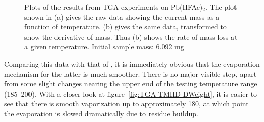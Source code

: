 \begin{figure}[tbp]
   \centering
	\hspace{1cm}
   \caption[TGA Results for Pb(HFAc)$_{2}$ Precursor]%
   		{Plots of the results from TGA experiments on Pb(HFAc)$_{2}$. The plot shown in (a) gives the raw %
		data showing the current mass as a function of temperature. (b) gives the same data, transformed %
		to show the derivative of mass. Thus (b) shows the rate of mass loss at a given temperature. Initial %
		sample mass: 6.092 mg}
   \label{fig:TGA-HFAc}
\end{figure}

Comparing this data with that of \TMHD{}, it is immediately obvious that the evaporation mechanism for the latter is much smoother. There is no major visible step, apart from some slight changes nearing the upper end of the testing temperature range (185--200\degC{}). With a closer look at figure~\ref{fig:TGA-TMHD-DWeight}, it is easier to see that there is smooth vaporization up to approximately 180\degC{}, at which point the evaporation is slowed dramatically due to residue buildup. 

